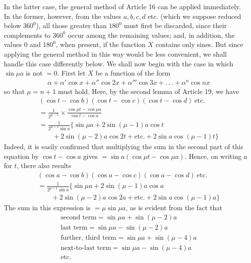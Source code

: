 In the latter case, the general method of Article 16 can be applied immediately. In the former, however, from the values $a,b,c,d$ etc. (which we suppose reduced below $360^{0}$), all those greater than $180^{0}$ must first be discarded, since their complements to $360^{0}$ occur among the remaining values; and, in addition, the values $0$ and $180^{0}$, when present, if the function $X$ contains only sines. But since applying the general method in this way would be less convenient, we shall handle this case differently below. We shall now begin with the case in which $\sin\mu a$ is not $=0$.
First let $X$ be a function of the form
\[
\begin{aligned}
&\alpha+\alpha'\cos x+\alpha''\cos2x+\alpha'''\cos3x+.\,.\,.+\alpha^{n}\cos nx
\end{aligned}
\]
so that $\mu=n+1$ must hold. Here, by the second lemma of Article 19, we have
\[
\begin{aligned}
&(\cos t-\cos b)(\cos t-\cos c)(\cos t-\cos d)\ \text{etc.}
\\[5pt]
&=\frac1{2^{\mu-1}}\times\frac{\cos\mu t-\cos\mu a}{\cos t-\cos a}\\[5pt]
&=\frac1{2^{\mu-1}\sin a}\{\sin\mu a+2\sin(\mu-1)a\cos t\\[5pt]
&\qquad{}+2\sin(\mu-2)a\cos2t+\text{etc.}+2\sin a\cos(\mu-1)t\}
\end{aligned}
\]
Indeed, it is easily confirmed that multiplying the sum in the second part of this equation by $\cos t-\cos a$ gives $=\sin a(\cos\mu t-\cos\mu a)$. Hence, on writing $a$ for $t$, there also results
\[
\begin{aligned}
&(\cos a-\cos b)(\cos a-\cos c)(\cos a-\cos d)\ \text{etc.}
\\[5pt]
&=\frac1{2^{\mu-1}\sin a}\{\sin\mu a+2\sin(\mu-1)a\cos a\\[5pt]
&\qquad+2\sin(\mu-2)a\cos2a+\text{etc.}+2\sin a\cos(\mu-1)a\}
\end{aligned}
\]
The sum in this expression is $=\mu\sin\mu a$, as is evident from the fact that
\[
\begin{aligned}
&\text{second term}=\sin\mu a+\sin(\mu-2)a\\[5pt]
&\text{last term}=\sin\mu a-\sin(\mu-2)a\\[5pt]
&\text{further, third term}=\sin\mu a+\sin(\mu-4)a\\[5pt]
&\text{next-to-last term}=\sin\mu a-\sin(\mu-4)a\\[5pt]
&\text{etc.}
\end{aligned}
\]
